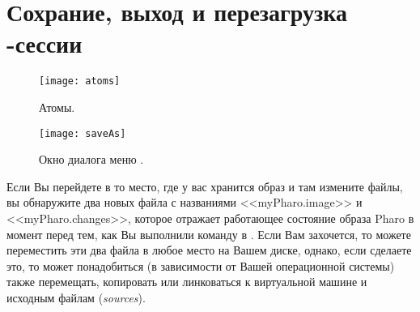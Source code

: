 \documentclass[a4paper,10pt,twoside]{book}
\begin{document}
\section{Сохрание, выход и перезагрузка \pharo-сессии}



\begin{figure}[htb]
\begin{minipage}[b]{0.48\textwidth}
\centerline {\texttt{[image: atoms]}}
\caption{Атомы.}
\end{minipage}
\hfill
\begin{minipage}[b]{0.48\textwidth}
\centerline {\texttt{[image: saveAs]}}
\caption{Окно диалога меню .}
\end{minipage}
\end{figure}




Если Вы перейдете в то место, где у вас хранится образ
и там измените файлы, вы обнаружите два новых файла
с названиями <<myPharo.image>> и <<myPharo.changes>>,
которое отражает работающее состояние образа Pharo в момент перед
тем, как Вы выполнили команду в \pharo {}.
Если Вам захочется, то  можете переместить эти два файла
в любое место на Вашем диске, однако, если сделаете это,
то может понадобиться  (в зависимости от Вашей операционной системы)
также перемещать, копировать или линковаться к виртуальной машине
и исходным файлам (\emph{sources}). 
\end{document}

